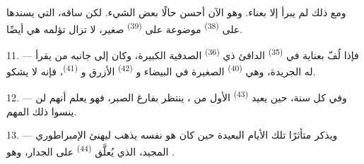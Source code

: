 ومع ذلك لم يبرأ إلا بعناء. وهو الآن أحسن حالًا بعض الشيء. لكن ساقه، التي
يسندها على  \textsuperscript{(38)} موضوعة على 
\textsuperscript{(39)} صغير، لا تزال تؤلمه هي أيضًا.

11. --- فإذا لُفّ بعناية في  \textsuperscript{(35)} الدافئ ذي
 \textsuperscript{(36)} الصدفية الكبيرة، وكان إلى جانبه من يقرأ
له الجريدة، وهي  \textsuperscript{(40)} الصغيرة في 
البيضاء و \textsuperscript{(42)} الأزرق و
\textsuperscript{(41)}، فإنه لا يشكو.

12. --- وفي كل سنة، حين يعيد  \textsuperscript{(43)}
 الأول من ، ينتظر  بفارغ الصبر،
فهو يعلم أنهم لن ينسوا ذلك  المهم.

13. --- ويذكر متأثرًا تلك الأيام البعيدة حين كان هو نفسه يذهب ليهنئ
 الإمبراطوري المجيد، الذي يُعلَّق 
\textsuperscript{(44)} على الجدار، وهو .
\VUsaut{6.0mm}
\VUfilet{22mm}
